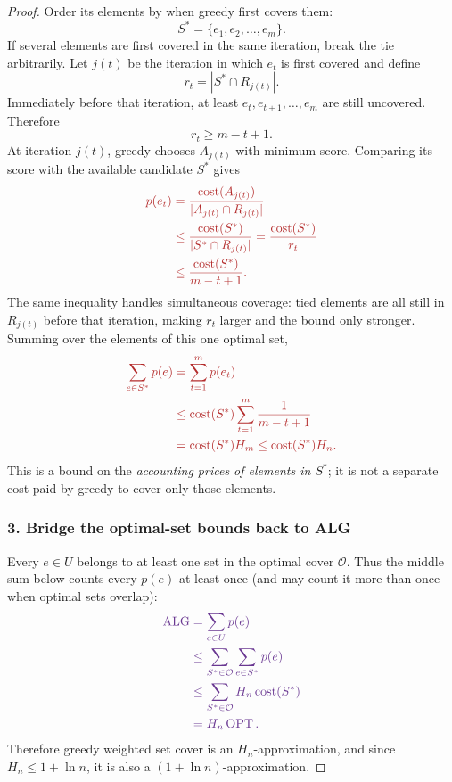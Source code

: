 \documentclass[10pt]{article}
\theoremstyle{definition}
\newcommand{\OPT}{\operatorname{OPT}}
\newcommand{\ALG}{\operatorname{ALG}}
\begin{document}
\begin{proof}
Order its elements by when greedy first covers them:
\[
  S^*=\{e_1,e_2,\ldots,e_m\}.
\]
If several elements are first covered in the same iteration, break the tie
arbitrarily. Let $j(t)$ be the iteration in which $e_t$ is first covered and
define
\[
  r_t=|S^*\cap R_{j(t)}|.
\]
Immediately before that iteration, at least
$e_t,e_{t+1},\ldots,e_m$ are still uncovered. Therefore
\[
  r_t\geq m-t+1.
\]
At iteration $j(t)$, greedy chooses $A_{j(t)}$ with minimum score. Comparing
its score with the available candidate $S^*$ gives
\[
  \color{optred}
  \begin{aligned}
  p(e_t)
  &=\frac{\operatorname{cost}(A_{j(t)})}
          {|A_{j(t)}\cap R_{j(t)}|}\\
  &\leq\frac{\operatorname{cost}(S^*)}{|S^*\cap R_{j(t)}|}
   =\frac{\operatorname{cost}(S^*)}{r_t}\\
  &\leq\frac{\operatorname{cost}(S^*)}{m-t+1}.
  \end{aligned}
\]
The same inequality handles simultaneous coverage: tied elements are all
still in $R_{j(t)}$ before that iteration, making $r_t$ larger and the bound
only stronger. Summing over the elements of this one optimal set,
\[
  \color{optred}
  \begin{aligned}
  \sum_{e\in S^*}p(e)
  &=\sum_{t=1}^{m}p(e_t)\\
  &\leq\operatorname{cost}(S^*)
    \sum_{t=1}^{m}\frac1{m-t+1}\\
  &=\operatorname{cost}(S^*)H_m
   \leq\operatorname{cost}(S^*)H_n.
  \end{aligned}
\]
This is a bound on the \emph{accounting prices of elements in $S^*$}; it is
not a separate cost paid by greedy to cover only those elements.

\subsubsection*{\textcolor{bridgepurple}{3. Bridge the optimal-set bounds back to ALG}}

Every $e\in U$ belongs to at least one set in the optimal cover $\mathcal O$.
Thus the middle sum below counts every $p(e)$ at least once (and may count it
more than once when optimal sets overlap):
\[
  \color{bridgepurple}
  \begin{aligned}
  \ALG
  &=\sum_{e\in U}p(e)\\
  &\leq\sum_{S^*\in\mathcal O}\sum_{e\in S^*}p(e)\\
  &\leq\sum_{S^*\in\mathcal O}
      H_n\operatorname{cost}(S^*)\\
  &=H_n\OPT.
  \end{aligned}
\]
Therefore greedy weighted set cover is an $H_n$-approximation, and since
$H_n\leq1+\ln n$, it is also a $(1+\ln n)$-approximation.
\end{proof}
\end{document}
